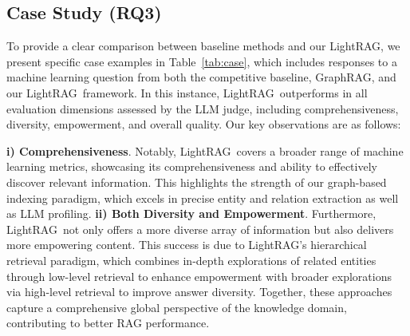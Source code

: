 \documentclass{article} %
\def\model{LightRAG}
\begin{document}
\subsection{Case Study (RQ3)}
To provide a clear comparison between baseline methods and our \model, we present specific case examples in Table~\ref{tab:case}, which includes responses to a machine learning question from both the competitive baseline, GraphRAG, and our \model\ framework. In this instance, \model\ outperforms in all evaluation dimensions assessed by the LLM judge, including comprehensiveness, diversity, empowerment, and overall quality. Our key observations are as follows:

\textbf{i) Comprehensiveness}. Notably, \model\ covers a broader range of machine learning metrics, showcasing its comprehensiveness and ability to effectively discover relevant information. This highlights the strength of our graph-based indexing paradigm, which excels in precise entity and relation extraction as well as LLM profiling.
\textbf{ii) Both Diversity and Empowerment}.
Furthermore, \model\ not only offers a more diverse array of information but also delivers more empowering content. This success is due to \model's hierarchical retrieval paradigm, which combines in-depth explorations of related entities through low-level retrieval to enhance empowerment with broader explorations via high-level retrieval to improve answer diversity. Together, these approaches capture a comprehensive global perspective of the knowledge domain, contributing to better RAG performance.
\end{document}
